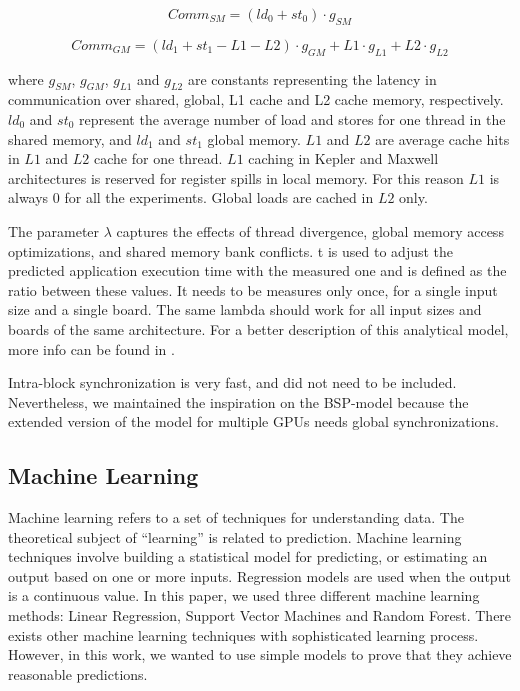 \begin{equation}\label{ec:SM}
Comm_{SM} = \left(ld_{0} + st_{0} \right) \cdot g_{SM}
\end{equation}


\begin{equation}\label{ec:GM}
Comm_{GM} = \left(ld_{1} + st_{1} - L1 - L2 \right) \cdot g_{GM} +  L1\cdot g_{L1} + L2\cdot g_{L2} 
\end{equation}

\noindent where $g_{SM}$, $g_{GM}$, $g_{L1}$ and $g_{L2}$ are constants representing the latency in communication over shared, global, L1 cache and L2 cache memory, respectively. $ld_0$ and $st_0$ represent the average number of load and stores for one thread in the shared memory, and $ld_1$ and $st_1$ global memory. $L1$ and $L2$ are average cache hits in $L1$ and $L2$ cache for one thread. $L1$ caching in Kepler and Maxwell architectures is reserved for register spills in local memory. For this reason $L1$ is always 0 for all the experiments. Global loads are cached in $L2$ only.

The parameter $\lambda$ captures the effects of thread divergence, global memory access optimizations, and shared memory bank conflicts. t is used to adjust the predicted application execution time with the measured one and is defined as the ratio between these values. It needs to be measures only once, for a single input size and a single board. The same lambda should work for all input sizes and boards of the same architecture. For a better description of this analytical model, more info can be found in \cite{BSPGPUCache:2015}.

Intra-block synchronization is very fast, and did not need to be included. Nevertheless, we maintained the inspiration on the BSP-model because the extended version of the model for multiple GPUs needs global synchronizations.

\subsection{Machine Learning}\label{ssec:ML}
Machine learning refers to a set of techniques for understanding data. The theoretical subject of ``learning'' is related to prediction. Machine learning techniques involve building a statistical model for predicting, or estimating an output based on one or more inputs. Regression models are used when the output is a continuous value. In this paper, we used three different machine learning methods: Linear Regression, Support Vector Machines and Random Forest. There exists other machine learning techniques with sophisticated learning process. However, in this work, we wanted to use simple models to prove that they achieve reasonable predictions.

